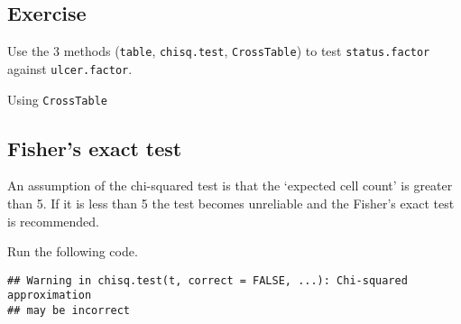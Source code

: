 \documentclass[]{book}
\makeatletter
\newenvironment{Shaded}{\begin{snugshade}}{\end{snugshade}}
\newcommand{\KeywordTok}[1]{\textcolor[rgb]{0.13,0.29,0.53}{\textbf{#1}}}
\newcommand{\DataTypeTok}[1]{\textcolor[rgb]{0.13,0.29,0.53}{#1}}
\newcommand{\OtherTok}[1]{\textcolor[rgb]{0.56,0.35,0.01}{#1}}
\newcommand{\OperatorTok}[1]{\textcolor[rgb]{0.81,0.36,0.00}{\textbf{#1}}}
\newcommand{\NormalTok}[1]{#1}
\newenvironment{kframe}{%
\medskip{}
\setlength{\fboxsep}{.8em}
 \def\at@end@of@kframe{}%
 \ifinner\ifhmode%
  \def\at@end@of@kframe{\end{minipage}}%
  \begin{minipage}{\columnwidth}%
 \fi\fi%
 \def\FrameCommand##1{\hskip\@totalleftmargin \hskip-\fboxsep
 \colorbox{shadecolor}{##1}\hskip-\fboxsep
     \hskip-\linewidth \hskip-\@totalleftmargin \hskip\columnwidth}%
 \MakeFramed {\advance\hsize-\width
   \@totalleftmargin\z@ \linewidth\hsize
   \@setminipage}}%
 {\par\unskip\endMakeFramed%
 \at@end@of@kframe}
\renewenvironment{Shaded}{\begin{kframe}}{\end{kframe}}
\theoremstyle{definition}
\theoremstyle{definition}
\theoremstyle{definition}
\theoremstyle{remark}
\makeatother
\begin{document}
\subsection{Exercise}\label{exercise-41}

Use the 3 methods (\texttt{table}, \texttt{chisq.test},
\texttt{CrossTable}) to test \texttt{status.factor} against
\texttt{ulcer.factor}.

\begin{Shaded}
\end{Shaded}

Using \texttt{CrossTable}

\begin{Shaded}
\end{Shaded}

\subsection{Fisher's exact test}\label{fishers-exact-test}

An assumption of the chi-squared test is that the `expected cell count'
is greater than 5. If it is less than 5 the test becomes unreliable and
the Fisher's exact test is recommended.

Run the following code.

\begin{Shaded}
\end{Shaded}

\begin{verbatim}
## Warning in chisq.test(t, correct = FALSE, ...): Chi-squared approximation
## may be incorrect
\end{verbatim}
\end{document}
